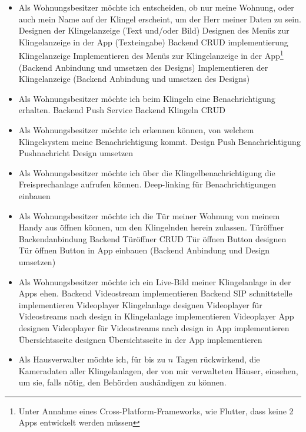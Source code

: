 \begin{itemize}
    \item Als Wohnungsbesitzer möchte ich entscheiden, ob nur meine Wohnung, oder auch mein Name auf der Klingel erscheint, um der Herr meiner Daten zu sein.
        \subitem Designen der Klingelanzeige (Text und/oder Bild)
        \subitem Designen des Menüs zur Klingelanzeige in der App (Texteingabe)
        \subitem Backend CRUD implementierung Klingelanzeige
        \subitem Implementieren des Menüs zur Klingelanzeige in der App\footnote{Unter Annahme eines Cross-Platform-Frameworks, wie Flutter, dass keine 2 Apps entwickelt werden müssen} (Backend Anbindung und umsetzen des Designs)
        \subitem Implementieren der Klingelanzeige (Backend Anbindung und umsetzen des Designs)
    \item Als Wohnungsbesitzer möchte ich beim Klingeln eine Benachrichtigung erhalten.
        \subitem Backend Push Service
        \subitem Backend Klingeln CRUD
    \item Als Wohnungsbesitzer möchte ich erkennen können, von welchem Klingelsystem meine Benachrichtigung kommt.
        \subitem Design Push Benachrichtigung
        \subitem Pushnachricht Design umsetzen
    \item Als Wohnungsbesitzer möchte ich über die Klingelbenachrichtigung die Freisprechanlage aufrufen können.
        \subitem Deep-linking für Benachrichtigungen einbauen
    \item Als Wohnungsbesitzer möchte ich die Tür meiner Wohnung von meinem Handy aus öffnen können, um den Klingelnden herein zulassen.
        \subitem Türöffner Backendanbindung
        \subitem Backend Türöffner CRUD
        \subitem Tür öffnen Button designen
        \subitem Tür öffnen Button in App einbauen (Backend Anbindung und Design umsetzen)
    \item Als Wohnungsbesitzer möchte ich ein Live-Bild meiner Klingelanlage in der Apps ehen.
        \subitem Backend Videostream implementieren
        \subitem Backend SIP schnittstelle implementieren
        \subitem Videoplayer Klingelanlage designen
        \subitem Videoplayer für Videostreams nach design in Klingelanlage implementieren
        \subitem Videoplayer App designen
        \subitem Videoplayer für Videostreams nach design in App implementieren
        \subitem Übersichtsseite  designen
        \subitem Übersichtsseite  in der App implementieren
    \item Als Hausverwalter möchte ich, für bis zu $n$ Tagen rückwirkend, die Kameradaten aller Klingelanlagen, der von mir verwalteten Häuser, einsehen, um sie, falls nötig, den Behörden aushändigen zu können.

\end{itemize}
